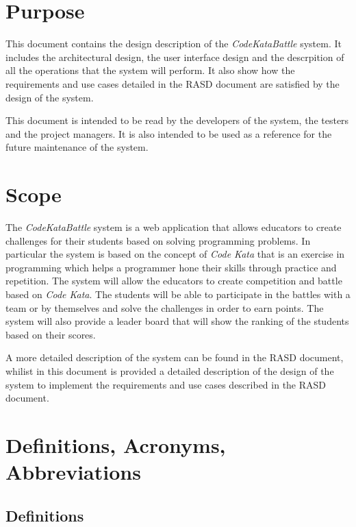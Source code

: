 \section{Purpose}
\label{s:Purpose}%

This document contains the design description of the \emph{CodeKataBattle} system. It includes the architectural design, the user interface design and the descrpition of all the operations that the system will perform. It also show how the requirements and use cases detailed in the RASD document are satisfied by the design of the system.

This document is intended to be read by the developers of the system, the testers and the project managers. It is also intended to be used as a reference for the future maintenance of the system.

\section{Scope}
\label{s:Scope}%

The \emph{CodeKataBattle} system is a web application that allows educators to create challenges for their students based on solving programming problems. In particular the system is based on the concept of \emph{Code Kata} that is an exercise in programming which helps a programmer hone their skills through practice and repetition. The system will allow the educators to create competition and battle based on \emph{Code Kata}. The students will be able to participate in the battles with a team or by themselves and solve the challenges in order to earn points. The system will also provide a leader board that will show the ranking of the students based on their scores.

A more detailed description of the system can be found in the RASD document, whilist in this document is provided a detailed description of the design of the system to implement the requirements and use cases described in the RASD document.

\newpage

\section{Definitions, Acronyms, Abbreviations}
\label{s:definitions-acronyms-abbreviations}%
\subsection{Definitions}
\label{ss:Definitions}

